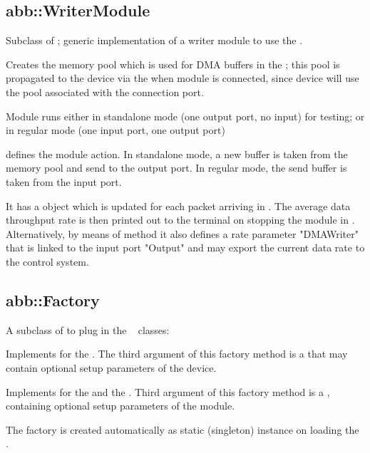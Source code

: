 \subsection{abb::WriterModule}
Subclass of ; generic implementation of a writer module to use the .
\begin{compactenum} 

\item Creates the memory pool which is used for DMA buffers in the ; this pool is propagated to the device via the  when module is connected, since device will use the pool associated with the connection port.

\item Module runs either in standalone mode (one output port, no input) for testing; or in regular mode (one input port, one output port)

\item {} defines the module action. In standalone mode, a new buffer is taken from the memory pool and send to the output port. In regular mode, the send buffer is taken from the input port.

\item It has a  object which is updated
for each packet arriving in . The average data 
throughput rate is then printed out to the terminal 
on stopping the module in .
Alternatively, by means of method 
it also defines a rate parameter "DMAWriter" that is linked to the
input port "Output" and may export the current data rate to the
control system.

\end{compactenum} 

\subsection{abb::Factory}
A subclass of  to plug in the \ABB~ classes:
\begin{compactenum} 

\item Implements  for the . The third argument 
of this factory method is a  that may contain optional setup parameters of the device.

\item Implements  for the  and the . Third argument of this factory method is a , containing optional setup parameters of the module.

\item The factory is created automatically as static (singleton) instance on loading the .

\end{compactenum} 


